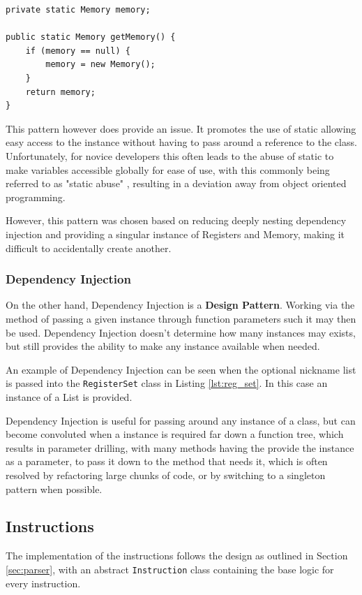 \begin{lstlisting}[caption=Singleton pattern using within the \texttt{Memory} class, label=lst:singleton]
private static Memory memory;

public static Memory getMemory() {
    if (memory == null) {
        memory = new Memory();
    }
    return memory;
}
\end{lstlisting}

This pattern however does provide an issue. It promotes the use of static allowing easy access to the instance without having to pass around a reference to the class. Unfortunately, for novice developers this often leads to the abuse of static to make variables accessible globally for ease of use, with this commonly being referred to as "static abuse" \cite{zivkovic_2021_3}, resulting in a deviation away from object oriented programming.

However, this pattern was chosen based on reducing deeply nesting dependency injection and providing a singular instance of Registers and Memory, making it difficult to accidentally create another.

\subsubsection{Dependency Injection}
On the other hand, Dependency Injection is a \textbf{Design Pattern}. Working via the method of passing a given instance through function parameters such it may then be used. Dependency Injection doesn't determine how many instances may exists, but still provides the ability to make any instance available when needed.

An example of Dependency Injection can be seen when the optional nickname list is passed into the \texttt{RegisterSet} class in Listing
\ref{lst:reg_set}. In this case an instance of a List is provided.

Dependency Injection is useful for passing around any instance of a class, but can become convoluted when a instance is required far down a function tree, which results in parameter drilling, with many methods having the provide the instance as a parameter, to pass it down to the method that needs it, which is often resolved by refactoring large chunks of code, or by switching to a singleton pattern when possible.

\subsection{Instructions}
The implementation of the instructions follows the design as outlined in Section \ref{sec:parser}, with an abstract \texttt{Instruction} class containing the base logic for every instruction. 

